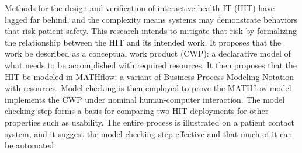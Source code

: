 Methods for the design and verification of interactive health IT (HIT) have lagged far behind, and the complexity means systems may demonstrate behaviors that risk patient safety. This research intends to mitigate that risk by formalizing the relationship between the HIT and its intended work. It proposes that the work be described as a conceptual work product (CWP): a declarative model of what needs to be accomplished with required resources. It then proposes that the HIT be modeled in MATHflow: a variant of Business Process Modeling Notation with resources. Model checking is then employed to prove the MATHflow model implements the CWP under nominal human-computer interaction. The model checking step forms a basis for comparing two HIT deployments for other properties such as usability. The entire process is illustrated on a patient contact system, and it suggest the model checking step effective and that much of it can be automated.



